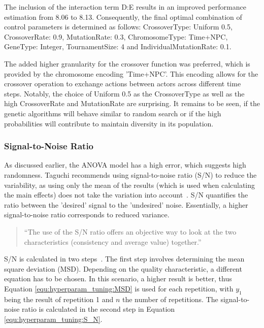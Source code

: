 The inclusion of the interaction term D:E results in an improved performance estimation from 8.06 to 8.13. Consequently, the final optimal combination of control parameters is determined as follows: CrossoverType: Uniform 0.5, CrossoverRate: 0.9, MutationRate: 0.3, ChromosomeType: Time+NPC, GeneType: Integer, TournamentSize: 4 and IndividualMutationRate: 0.1.

The added higher granularity for the crossover function was preferred, which is provided by the chromosome encoding 'Time+NPC'. This encoding allows for the crossover operation to exchange actions between actors across different time steps. Notably, the choice of Uniform 0.5 as the CrossoverType as well as the high CrossoverRate and MutationRate are surprising. It remains to be seen, if the genetic algorithms will behave similar to random search or if the high probabilities will contribute to maintain diversity in its population.

\subsubsection{Signal-to-Noise Ratio}
As discussed earlier, the ANOVA model has a high error, which suggests high randomness. Taguchi recommends using signal-to-noise ratio (S/N) to reduce the variability, as using only the mean of the results (which is used when calculating the main effects) does not take the variation into account~\cite{roy_primer_1990}. S/N quantifies the ratio between the 'desired' signal to the 'undesired' noise. Essentially, a higher signal-to-noise ratio corresponds to reduced variance.

\begin{quote}
	\begin{em}
		\enquote{The use of the S/N ratio offers an objective way to look at the two characteristics (consistency and average value) together.}~\cite{roy_primer_1990}
	\end{em}
\end{quote}

S/N is calculated in two steps~\cite{roy_primer_1990}. The first step involves determining  the mean square deviation (MSD). Depending on the quality characteristic, a different equation has to be chosen. In this scenario, a higher result is better, thus Equation \ref{equ:hyperparam_tuning:MSD} is used for each repetition, with $y_1$ being the result of repetition 1 and $n$ the number of repetitions. The signal-to-noise ratio is calculated in the second step in Equation \ref{equ:hyperparam_tuning:S_N}.

